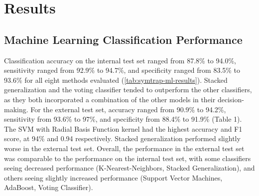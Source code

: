{\section{Results}
\subsection{Machine Learning Classification Performance}
Classification accuracy on the internal test set ranged from 87.8\% to 94.0\%, sensitivity ranged from 92.9\% to 94.7\%, and specificity ranged from 83.5\% to 93.6\% for all eight methods evaluated (\cref{tab:symtrap-ml-results}).
Stacked generalization and the voting classifier tended to outperform the other classifiers, as they both incorporated a combination of the other models in their decision-making.
For the external test set, accuracy ranged from 90.9\% to 94.2\%, sensitivity from 93.6\% to 97\%, and specificity from 88.4\% to 91.9\%  (Table 1).
The SVM with Radial Basis Function kernel had the highest accuracy and F1 score, at 94\% and 0.94 respectively. Stacked generalization performed slightly worse in the external test set.
Overall, the performance in the external test set was comparable to the performance on the internal test set, with some classifiers seeing decreased performance (K-Nearest-Neighbors, Stacked Generalization), and others seeing slightly increased performance (Support Vector Machines, AdaBoost, Voting Classifier).


}
